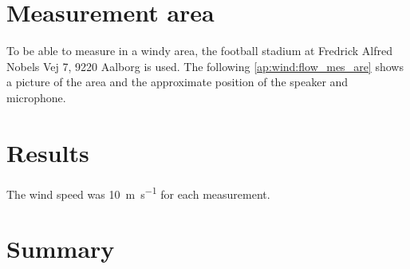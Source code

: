 \section*{Measurement area}
To be able to measure in a windy area, the football stadium at Fredrick Alfred Nobels Vej 7, 9220 Aalborg is used. The following \autoref{ap:wind:flow_mes_are} shows a picture of the area and the approximate position of the speaker and microphone.


\section*{Results}

The wind speed was \SI{10}{\meter\per\second} for each measurement.





\section*{Summary}